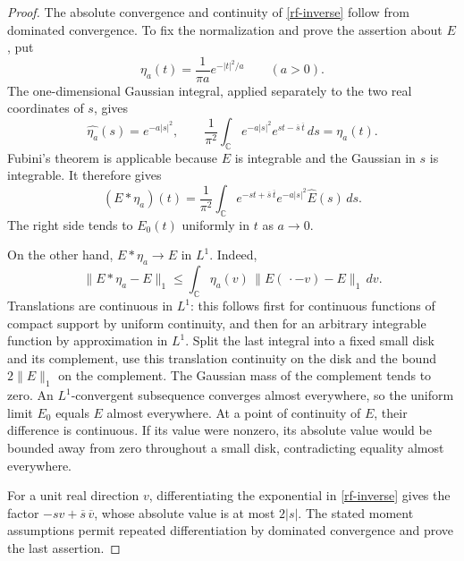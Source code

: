 \begin{proof}
The absolute convergence and continuity of \eqref{rf-inverse}
follow from dominated convergence.  To fix the normalization
and prove the assertion about $E$, put
\[
 \eta_a(t)=\frac1{\pi a}e^{-|t|^2/a}\qquad(a>0).
\]
The one-dimensional Gaussian integral, applied separately to
the two real coordinates of $s$, gives
\[
 \widehat{\eta_a}(s)=e^{-a|s|^2},\qquad
 \frac1{\pi^2}\int_{\mathbb C}e^{-a|s|^2}
        e^{st-\overline s\,\overline t}\,ds=\eta_a(t).
\]
Fubini's theorem is applicable because $E$ is integrable and
the Gaussian in $s$ is integrable.  It therefore gives
\[
 (E*\eta_a)(t)=\frac1{\pi^2}\int_{\mathbb C}
      e^{-st+\overline s\,\overline t}
      e^{-a|s|^2}\widehat E(s)\,ds.
\]
The right side tends to $E_0(t)$ uniformly in $t$ as $a\to0$.

On the other hand, $E*\eta_a\to E$ in $L^1$.
Indeed,
\[
 \|E*\eta_a-E\|_1
 \leq\int_{\mathbb C}\eta_a(v)\,
                    \|E(\,\cdot-v)-E\|_1\,dv.
\]
Translations are continuous in $L^1$: this follows first for
continuous functions of compact support by uniform continuity,
and then for an arbitrary integrable function by approximation
in $L^1$.  Split the last integral into a fixed small disk
and its complement, use this translation continuity on the
disk and the bound $2\|E\|_1$ on the complement.
The Gaussian mass of the complement tends to zero.
An $L^1$-convergent subsequence converges almost everywhere,
so the uniform limit $E_0$ equals $E$ almost everywhere.
At a point of continuity of $E$, their difference is continuous.
If its value were nonzero, its absolute value would be bounded
away from zero throughout a small disk, contradicting equality
almost everywhere.

For a unit real direction $v$, differentiating the exponential
in \eqref{rf-inverse} gives the factor
$-sv+\overline s\,\overline v$, whose absolute value is at most
$2|s|$.  The stated moment assumptions permit repeated
differentiation by dominated convergence and prove the last
assertion.
\end{proof}


